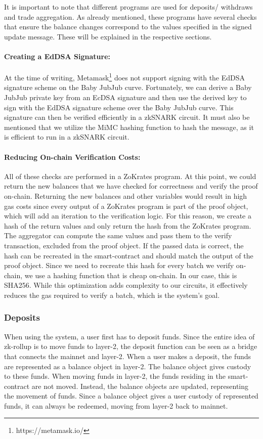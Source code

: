 \documentclass[../../thesis.tex]{subfiles}
\begin{document}
It is important to note that different programs are used for deposits/ withdraws and trade aggregation. As already mentioned, these programs have several checks that ensure the balance changes correspond to the values specified in the signed update message. These will be explained in the respective sections. 

\paragraph{Creating a EdDSA Signature:} \label{signature}
At the time of writing, Metamask\footnote{https://metamask.io/} does not support signing with the EdDSA signature scheme on the Baby JubJub curve. Fortunately, we can derive a Baby JubJub private key from an EcDSA signature and then use the derived key to sign with the EdDSA signature scheme over the Baby JubJub curve. This signature can then be verified efficiently in a zkSNARK circuit. It must also be mentioned that we utilize the MiMC hashing function to hash the message, as it is efficient to run in a zkSNARK circuit.

\paragraph{Reducing On-chain Verification Costs:} \label{exec_and_reduce}
All of these checks are performed in a ZoKrates program. At this point, we could return the new balances that we have checked for correctness and verify the proof on-chain. Returning the new balances and other variables would result in high gas costs since every output of a ZoKrates program is part of the proof object, which will add an iteration to the verification logic. For this reason, we create a hash of the return values and only return the hash from the ZoKrates program. The aggregator can compute the same values and pass them to the verify transaction, excluded from the proof object. If the passed data is correct, the hash can be recreated in the smart-contract and should match the output of the proof object. Since we need to recreate this hash for every batch we verify on-chain, we use a hashing function that is cheap on-chain. In our case, this is SHA256. While this optimization adds complexity to our circuits, it effectively reduces the gas required to verify a batch, which is the system's goal.

\subsubsection{Deposits}
When using the system, a user first has to deposit funds. Since the entire idea of zk-rollup is to move funds to layer-2, the deposit function can be seen as a bridge that connects the mainnet and layer-2. When a user makes a deposit, the funds are represented as a balance object in layer-2. The balance object gives custody to these funds. When moving funds in layer-2, the funds residing in the smart-contract are not moved. Instead, the balance objects are updated, representing the movement of funds. Since a balance object gives a user custody of represented funds, it can always be redeemed, moving from layer-2 back to mainnet. 
\end{document}
